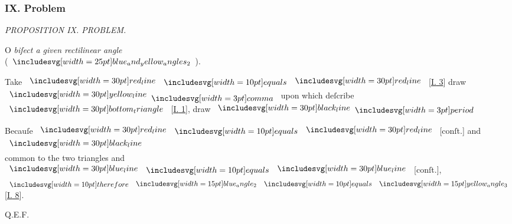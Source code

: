 \documentclass[11pt,preview]{standalone}
\begin{document}
\subsubsection{IX. Problem}

\hfill

\begin{minipage}[t]{0.55\textwidth}
    \begin{center}
        \textit{PROPOSITION IX. PROBLEM.}\label{book1pr9} \\
    \end{center}

    \hfill

    \begin{center}
        \raggedright \lettrine[lines=3, loversize=1, nindent=0pt]{}{}O \textit{biſect a given rectilinear angle}\\ (\hspace{-1ex}$\img{blue_and_yellow_angles_2}$\hspace{-1ex}).
    \end{center}
\end{minipage}%
\hfill
\begin{minipage}[t]{0.43\textwidth}
    \vspace{20pt}
    
\end{minipage}

\hfill

{\vspace{1ex}\begin{center}
        Take $\redline \bequals \redline$ [\hyperref[book1pr3]{\textsc{I.} 3}] draw $\yellowline \bcomma$ upon which deſcribe $\img[0][0][30]{bottom_triangle}$ [\hyperref[book1pr1]{\textsc{I.} 1}], draw $\blackline \bperiod$
    \end{center}}

\hfill

\begin{center}
    Becauſe $\redline \bequals \redline$ [conſt.] and $\blackline$\\
    common to the two triangles and $\blueline \bequals \blueline$ [conſt.],\\
    $\btherefore \img[0][0][15]{blue_angle_2} \bequals \img[0][0][15]{yellow_angle_3}$ [\hyperref[book1pr8]{\textsc{I.} 8}].
\end{center}

\hfill

\hfill Q.E.F.
\end{document}

